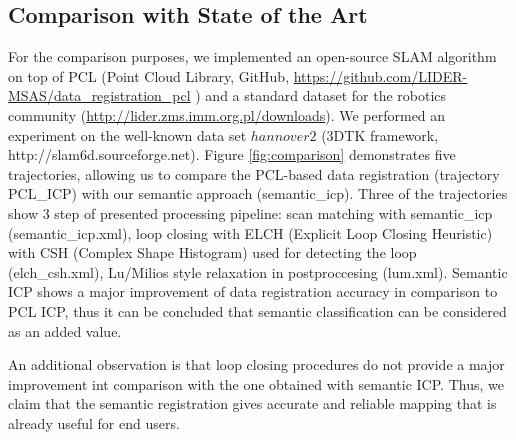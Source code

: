 \documentclass{article}
\begin{document}
\subsection{Comparison with State of the Art}
For the comparison purposes, we implemented an open-source SLAM algorithm on top of PCL (Point Cloud Library, GitHub, \url{https://github.com/LIDER-MSAS/data_registration_pcl} ) and a standard dataset for the robotics community (\url{http://lider.zms.imm.org.pl/downloads}). We performed an experiment on the well-known data set $hannover2$ (3DTK framework, http://slam6d.sourceforge.net). Figure \ref{fig:comparison} demonstrates five trajectories, allowing us to compare the PCL-based data registration (trajectory PCL\_ICP) with our semantic approach (semantic\_icp). Three of the trajectories show 3 step of presented processing pipeline: scan matching with semantic\_icp (semantic\_icp.xml), loop closing with ELCH (Explicit Loop Closing Heuristic) with CSH (Complex Shape Histogram)\cite{CSH_DARPA} used for detecting the loop (elch\_csh.xml), Lu/Milios style relaxation in postproccesing  (lum.xml). Semantic ICP shows a major improvement of data registration accuracy in comparison to PCL ICP, thus it can be concluded that semantic classification can be considered as an added value.

An additional observation is that loop closing procedures do not provide a major improvement int comparison with the one obtained with semantic ICP. Thus, we claim that the semantic registration gives accurate and reliable mapping that is already useful for end users.
\end{document}
